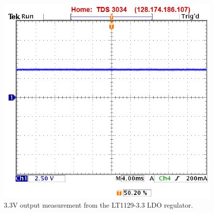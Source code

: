 \begin{figure}[htbp]
\centering
\includegraphics[width=.8\textwidth]{main_3_3v_output.png}
\caption{3.3V output measurement from the LT1129-3.3 LDO regulator.}
\label{fig:main_3_3v_output}
\end{figure}

